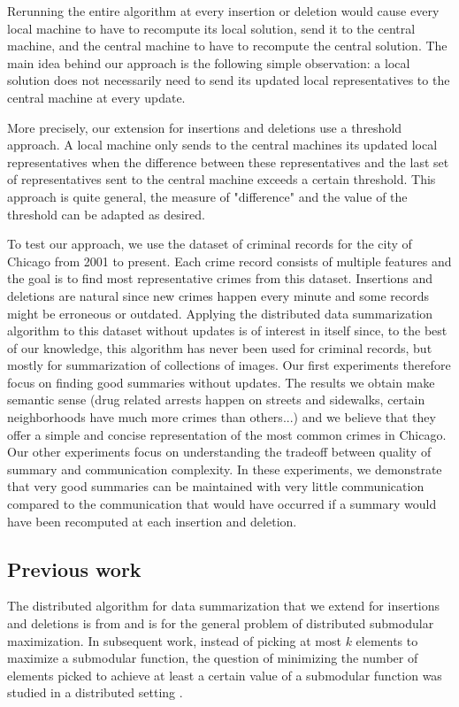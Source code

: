 	Rerunning the entire algorithm at every insertion or deletion would cause every local machine to have to recompute its local solution, send it to the central machine, and the central machine to have to recompute the central solution. The main idea behind our approach is the following simple observation: a local solution does not necessarily need to send its updated local representatives to the central machine at every update.
	
	More precisely, our extension for insertions and deletions use a threshold approach. A local machine only sends to the central machines its updated local representatives when the difference between these representatives and the last set of representatives sent to the central machine exceeds a certain threshold. This approach is quite general, the measure of "difference" and the value of the threshold can be adapted as desired.
	
	To test our approach, we use the dataset of criminal records for the city of Chicago from 2001 to present. Each crime record consists of multiple features and the goal is to find most representative crimes from this dataset. Insertions and deletions are natural since new crimes happen every minute and some records might be erroneous or outdated. Applying the distributed data summarization algorithm to this dataset without updates is of interest in itself since, to the best of our knowledge, this algorithm has never been used for criminal records, but mostly for summarization of collections of images. Our first experiments therefore focus on finding good summaries without updates. The results we obtain make semantic sense (drug related arrests happen on streets and sidewalks, certain neighborhoods have much more crimes than others...) and we believe that they offer a simple and concise representation of the most common crimes in Chicago. Our other experiments focus on understanding the tradeoff between quality of summary and communication complexity. In these experiments, we demonstrate that very good summaries can be maintained with very little communication compared to the communication that would have occurred if a summary would have been recomputed at each insertion and deletion.
	
	\subsection{Previous work}
	
	The distributed algorithm for data summarization that we extend for insertions and deletions is from \citet{mirzasoleiman2013distributed} and is for the general problem of distributed submodular maximization. In subsequent work, instead of picking at most $k$ elements to maximize a submodular function, the question of minimizing the number of elements picked to achieve at least a certain value of a submodular function was studied in a distributed setting \cite{mirzasoleiman2015distributed}. 
	
